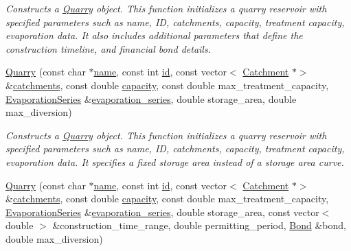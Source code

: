 \begin{DoxyCompactItemize}
\begin{DoxyCompactList}\small\item\em Constructs a \mbox{\hyperlink{classQuarry}{Quarry}} object. This function initializes a quarry reservoir with specified parameters such as name, ID, catchments, capacity, treatment capacity, evaporation data. It also includes additional parameters that define the construction timeline, and financial bond details. \end{DoxyCompactList}\item 
\mbox{\hyperlink{classQuarry_a28c4db26230c2ff3f82c8c0f70f2f124}{Quarry}} (const char $\ast$\mbox{\hyperlink{classWaterSource_a846ea74c5b453d014f594d41fee8c765}{name}}, const int \mbox{\hyperlink{classWaterSource_a6eafe5dfefd317877d1244e8a7c6e742}{id}}, const vector$<$ \mbox{\hyperlink{classCatchment}{Catchment}} $\ast$$>$ \&\mbox{\hyperlink{classWaterSource_a8c18c34f23f8a06685c1d12f462ed830}{catchments}}, const double \mbox{\hyperlink{classWaterSource_a2ec257b415b248214a8bce7fc5267723}{capacity}}, const double max\+\_\+treatment\+\_\+capacity, \mbox{\hyperlink{classEvaporationSeries}{Evaporation\+Series}} \&\mbox{\hyperlink{classReservoir_a2d2d9b302c13703309bb798d24136810}{evaporation\+\_\+series}}, double storage\+\_\+area, double max\+\_\+diversion)
\begin{DoxyCompactList}\small\item\em Constructs a \mbox{\hyperlink{classQuarry}{Quarry}} object. This function initializes a quarry reservoir with specified parameters such as name, ID, catchments, capacity, treatment capacity, evaporation data. It specifies a fixed storage area instead of a storage area curve. \end{DoxyCompactList}\item 
\mbox{\hyperlink{classQuarry_a561616791620a55709bfca645bc8cbad}{Quarry}} (const char $\ast$\mbox{\hyperlink{classWaterSource_a846ea74c5b453d014f594d41fee8c765}{name}}, const int \mbox{\hyperlink{classWaterSource_a6eafe5dfefd317877d1244e8a7c6e742}{id}}, const vector$<$ \mbox{\hyperlink{classCatchment}{Catchment}} $\ast$$>$ \&\mbox{\hyperlink{classWaterSource_a8c18c34f23f8a06685c1d12f462ed830}{catchments}}, const double \mbox{\hyperlink{classWaterSource_a2ec257b415b248214a8bce7fc5267723}{capacity}}, const double max\+\_\+treatment\+\_\+capacity, \mbox{\hyperlink{classEvaporationSeries}{Evaporation\+Series}} \&\mbox{\hyperlink{classReservoir_a2d2d9b302c13703309bb798d24136810}{evaporation\+\_\+series}}, double storage\+\_\+area, const vector$<$ double $>$ \&construction\+\_\+time\+\_\+range, double permitting\+\_\+period, \mbox{\hyperlink{classBond}{Bond}} \&bond, double max\+\_\+diversion)

\end{DoxyCompactItemize}
